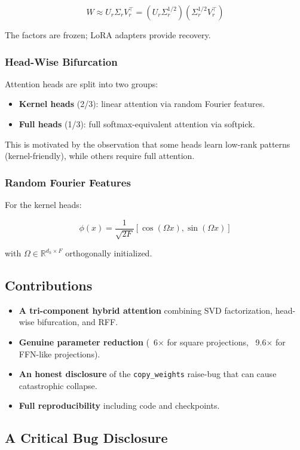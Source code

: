 \[
W \approx U_r \Sigma_r V_r^\top = (U_r \Sigma_r^{1/2})(\Sigma_r^{1/2} V_r^\top)
\]

The factors are frozen; LoRA adapters provide recovery.

\subsubsection{Head-Wise Bifurcation}

Attention heads are split into two groups:

\begin{itemize}
\item \textbf{Kernel heads} (2/3): linear attention via random Fourier features.
\item \textbf{Full heads} (1/3): full softmax-equivalent attention via softpick.

\end{itemize}
This is motivated by the observation that some heads learn low-rank 
patterns (kernel-friendly), while others require full attention.

\subsubsection{Random Fourier Features}

For the kernel heads:

\[
\phi(x) = \frac{1}{\sqrt{2F}} [\cos(\Omega x), \sin(\Omega x)]
\]

with $\Omega \in \mathbb{R}^{d_h \times F}$ orthogonally initialized.

\subsection{Contributions}

\begin{itemize}
\item \textbf{A tri-component hybrid attention} combining SVD factorization,
  head-wise bifurcation, and RFF.
\item \textbf{Genuine parameter reduction} (~6$\times$ for square projections, ~9.6$\times$ for
  FFN-like projections).
\item \textbf{An honest disclosure} of the \texttt{copy\_weights} raise-bug that can cause
  catastrophic collapse.
\item \textbf{Full reproducibility} including code and checkpoints.

\end{itemize}
\subsection{A Critical Bug Disclosure}

